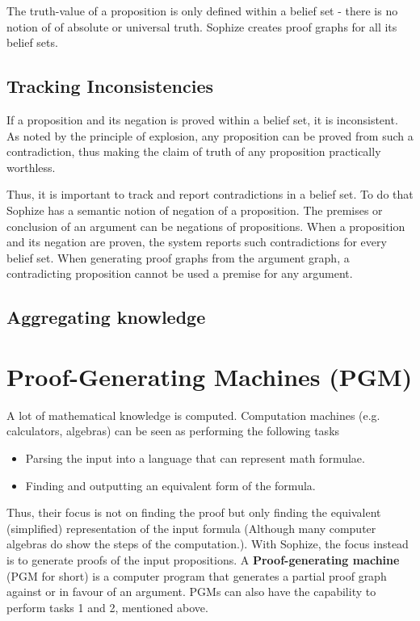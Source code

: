 \documentclass[a4paper]{article}
\begin{document}
The truth-value of a proposition is only defined within a belief set - there is no notion of of absolute or universal truth. Sophize creates proof graphs for all its belief sets.

\subsection{Tracking Inconsistencies}
If a proposition and its negation is proved within a belief set, it is inconsistent. As noted by the principle of explosion, any proposition can be proved from such a contradiction, thus making the claim of truth of any proposition practically worthless.

Thus, it is important to track and report contradictions in a belief set. To do that Sophize has a semantic notion of negation of a proposition. The premises or conclusion of an argument can be negations of propositions. When a proposition and its negation are proven, the system reports such contradictions for every belief set. When generating proof graphs from the argument graph, a contradicting proposition cannot be used a premise for any argument.

\subsection{Aggregating knowledge}



\section{Proof-Generating Machines (PGM)}
\label{sec:pgm}
A lot of mathematical knowledge is computed. Computation machines (e.g. calculators, algebras) can be seen as performing the following tasks
\begin{itemize}
\item Parsing the input into a language that can represent math formulae. 
\item Finding and outputting an equivalent form of the formula.
\end{itemize}
Thus, their focus is not on finding the proof but only finding the equivalent (simplified) representation of the input formula (Although many computer algebras do show the steps of the computation.). With Sophize, the focus instead is to generate proofs of the input propositions. A \textbf{Proof-generating machine} (PGM for short) is a computer program that generates a partial proof graph against or in favour of an argument. PGMs can also have the capability to perform tasks 1 and 2, mentioned above.
\end{document}
